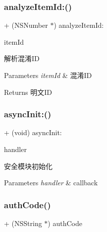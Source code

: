 \subsubsection{\texorpdfstring{analyze\+Item\+Id\+:()}{analyzeItemId:()}}
{\footnotesize\ttfamily + (N\+S\+Number $\ast$) analyze\+Item\+Id\+: \begin{DoxyParamCaption}\item[{(N\+S\+String $\ast$)}]{item\+Id }\end{DoxyParamCaption}}

解析混淆\+ID


\begin{DoxyParams}{Parameters}
{\em item\+Id} & 混淆\+ID \\
\hline
\end{DoxyParams}
\begin{DoxyReturn}{Returns}
明文\+ID 
\end{DoxyReturn}
\mbox{\label{interface_alibc_security_guard_bridge_ad280fc6693fe8e4d6996f56c3ad7a758}} 
\subsubsection{\texorpdfstring{async\+Init\+:()}{asyncInit:()}}
{\footnotesize\ttfamily + (void) async\+Init\+: \begin{DoxyParamCaption}\item[{(void($^\wedge$)(N\+S\+Error $\ast$))}]{handler }\end{DoxyParamCaption}}

安全模块初始化


\begin{DoxyParams}{Parameters}
{\em handler} & callback \\
\hline
\end{DoxyParams}
\mbox{\label{interface_alibc_security_guard_bridge_a797503616295719786f25a327510e076}} 
\subsubsection{\texorpdfstring{auth\+Code()}{authCode()}}
{\footnotesize\ttfamily + (N\+S\+String $\ast$) auth\+Code \begin{DoxyParamCaption}{ }\end{DoxyParamCaption}}

